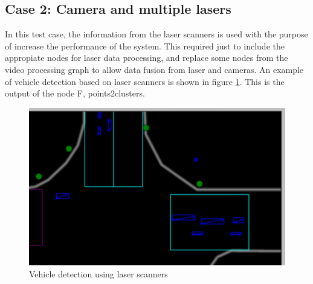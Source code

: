 \subsection{Case 2: Camera and multiple lasers}


In this test case, the information from the laser scanners is used with the purpose of increase the performance of the system. This required just to include the appropiate nodes for laser data processing, and replace some nodes from the video processing graph to allow data fusion from laser and cameras. An example of vehicle detection based on laser scanners is shown in figure \ref{laser_detection}. This is the output of the node F, points2clusters.

\begin{figure}[htb!]
\centering
\includegraphics[scale=0.35]{fig/4/laser1a.png}
\caption{Vehicle detection using laser scanners}
\label{laser_detection}
\end{figure}


